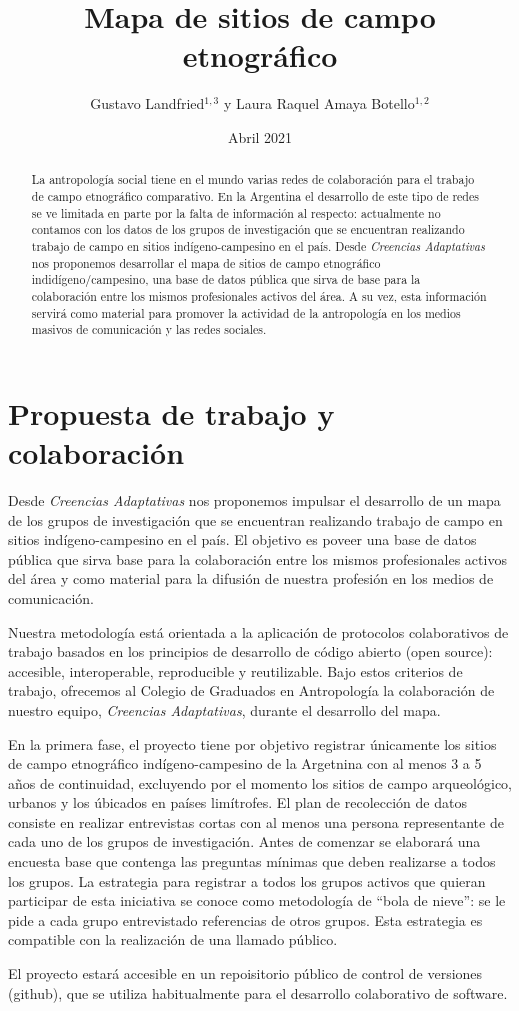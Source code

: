 \documentclass{article}
\title{Mapa de sitios de campo etnográfico}
\author{Gustavo Landfried$^{1,3}$ y Laura Raquel Amaya Botello$^{1,2}$}
\affil{\small 2 Universidad de Buenos Aires. 2 Universidad Nacional de Colombia. 3 Creencias Adaptativas}
\affil[]{Correspondencia: \url{gustavolandfried@gmail.com}}
\date{Abril 2021}
\begin{document}
\maketitle

\begin{abstract}
  La antropología social tiene en el mundo varias redes de colaboración para el trabajo de campo etnográfico comparativo.
  En la Argentina el desarrollo de este tipo de redes se ve limitada en parte por la falta de información al respecto: actualmente no contamos con los datos de los grupos de investigación que se encuentran realizando trabajo de campo en sitios indígeno-campesino en el país.
  Desde \emph{Creencias Adaptativas} nos proponemos desarrollar el mapa de sitios de campo etnográfico indidígeno/campesino, una base de datos pública que sirva de base para la colaboración entre los mismos profesionales activos del área.
  A su vez, esta información servirá como material para promover la actividad de la antropología en los medios masivos de comunicación y las redes sociales.
\end{abstract}

\section*{Propuesta de trabajo y colaboración}

Desde \emph{Creencias Adaptativas} nos proponemos impulsar el desarrollo de un mapa de los grupos de investigación que se encuentran realizando trabajo de campo en sitios indígeno-campesino en el país.
El objetivo es poveer una base de datos pública que sirva base para la colaboración entre los mismos profesionales activos del área y como material para la difusión de nuestra profesión en los medios de comunicación.

Nuestra metodología está orientada a la aplicación de protocolos colaborativos de trabajo basados en los principios de desarrollo de código abierto (open source): accesible, interoperable, reproducible y reutilizable.
Bajo estos criterios de trabajo, ofrecemos al Colegio de Graduados en Antropología la colaboración de nuestro equipo, \emph{Creencias Adaptativas}, durante el desarrollo del mapa.

En la primera fase, el proyecto tiene por objetivo registrar únicamente los sitios de campo etnográfico indígeno-campesino de la Argetnina con al menos 3 a 5 años de continuidad, excluyendo por el momento los sitios de campo arqueológico, urbanos y los úbicados en países limítrofes.
El plan de recolección de datos consiste en realizar entrevistas cortas con al menos una persona representante de cada uno de los grupos de investigación.
Antes de comenzar se elaborará una encuesta base que contenga las preguntas mínimas que deben realizarse a todos los grupos.
La estrategia para registrar a todos los grupos activos que quieran participar de esta iniciativa se conoce como metodología de ``bola de nieve'': se le pide a cada grupo entrevistado referencias de otros grupos.
Esta estrategia es compatible con la realización de una llamado público.

El proyecto estará accesible en un repoisitorio público de control de versiones (github), que se utiliza habitualmente para el desarrollo colaborativo de software.
\end{document}
